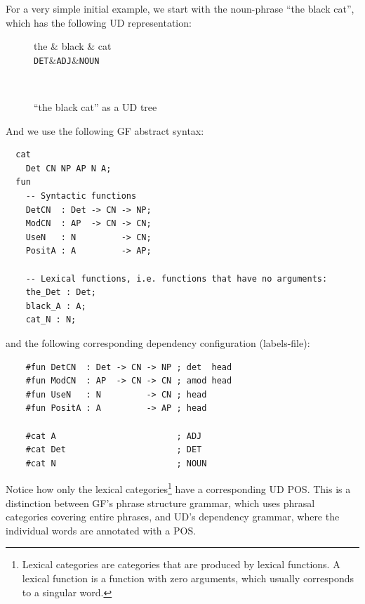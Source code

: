 For a very simple initial example, we start with the noun-phrase ``the black cat'', which has the following \ac{UD} representation:

\begin{figure}[H]
    \centering
    \setlength{\unitlength}{0.2mm}
    \begin{dependency}
        \begin{deptext}[column sep=0.4cm]
              the \& black \& cat \\
            {\tt DET}\&{\tt ADJ}\&{\tt NOUN}\\
        \end{deptext}
    \end{dependency} \\
    \caption{``the black cat'' as a UD tree}
    \label{fig:the_black_cat_ud}
\end{figure}

And we use the following \ac{GF} abstract syntax:

\begin{verbatim}
  cat
    Det CN NP AP N A;
  fun
    -- Syntactic functions
    DetCN  : Det -> CN -> NP;
    ModCN  : AP  -> CN -> CN;
    UseN   : N         -> CN;
    PositA : A         -> AP;

    -- Lexical functions, i.e. functions that have no arguments:
    the_Det : Det;
    black_A : A;
    cat_N : N;
\end{verbatim}
and the following corresponding dependency configuration (labels-file):
\begin{verbatim}
    #fun DetCN  : Det -> CN -> NP ; det  head
    #fun ModCN  : AP  -> CN -> CN ; amod head
    #fun UseN   : N         -> CN ; head
    #fun PositA : A         -> AP ; head

    #cat A                        ; ADJ
    #cat Det                      ; DET
    #cat N                        ; NOUN
\end{verbatim}

Notice how only the lexical categories\footnote{Lexical categories are categories that are produced by lexical functions. A lexical function is a function with zero arguments, which usually corresponds to a singular word.} have a corresponding \ac{UD} \ac{POS}. This is a distinction between \ac{GF}'s phrase structure grammar, which uses phrasal categories covering entire phrases, and \ac{UD}'s dependency grammar, where the individual words are annotated with a \ac{POS}.

